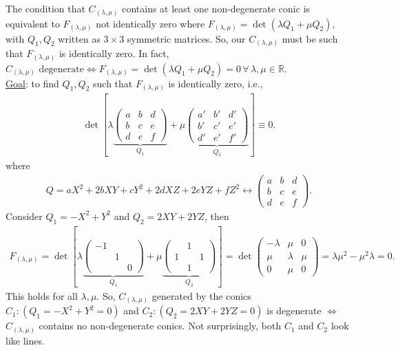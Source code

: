 \documentclass[12pt]{article}
\newcommand{\lb}{\left[}
\newcommand{\rb}{\right]}
\begin{document}
\noindent The condition that $C_{(\lambda,\mu)}$ contains at least one non-degenerate conic is equivalent to $F_{(\lambda,\mu)}$ not identically zero where
$F_{(\lambda,\mu)} = \det(\lambda Q_1 + \mu Q_2)$,
with $Q_1, Q_2$ written as $3\times 3$ symmetric matrices. So, our $C_{(\lambda,\mu)}$ must be such that $F_{(\lambda,\mu)}$ is identically zero. In fact, $C_{(\lambda,\mu)} \text{ degenerate} \iff F_{(\lambda,\mu)} = \det(\lambda Q_1 + \mu Q_2) = 0\, \forall \, \lambda,\mu \in \mathbb{R}$.\\

\noindent \underline{Goal}: to find $Q_1, Q_2$ such that $F_{(\lambda,\mu)}$ is identically zero, i.e.,
\begin{align*}
\det \lb \lambda \underbrace{\begin{pmatrix}
a&b&d\\b&c&e\\d&e&f
\end{pmatrix}}_{Q_1} 
+
\mu \underbrace{\begin{pmatrix}
a'&b'&d'\\b'&c'&e'\\d'&e'&f'
\end{pmatrix}}_{Q_2}\rb \equiv 0.
\end{align*}
where 
\begin{align*}
Q = aX^2 + 2bXY + cY^2 + 2dXZ + 2eYZ + fZ^2 \longleftrightarrow \begin{pmatrix}
a&b&d\\b&c&e\\d&e&f
\end{pmatrix}.
\end{align*}
Consider $Q_1 = -X^2 + Y^2$ and $Q_2 = 2XY + 2YZ$, then 
\begin{align*}
F_{(\lambda,\mu)} = \det 
\lb 
\lambda \underbrace{\begin{pmatrix}
-1&&\\&1&\\&&0
\end{pmatrix}}_{Q_1} 
+
\mu \underbrace{\begin{pmatrix}
&1&\\1&&1\\&1&
\end{pmatrix}}_{Q_2} 
\rb 
= \det \begin{pmatrix}
-\lambda & \mu & 0 \\\mu & \lambda & \mu \\ 0 & \mu & 0
\end{pmatrix} = \lambda \mu^2 - \mu^2 \lambda = 0.
\end{align*}
This holds for all $\lambda,\mu$. So, $C_{(\lambda,\mu)}$ generated by the conics $C_1:(Q_1 = -X^2 + Y^2=0)$ and $C_2: (Q_2 = 2XY + 2YZ =0) $ is degenerate $\iff$ $C_{(\lambda,\mu)}$ contains no non-degenerate conics. Not surprisingly, both $C_1$ and $C_2$ look like lines. 
\end{document}
